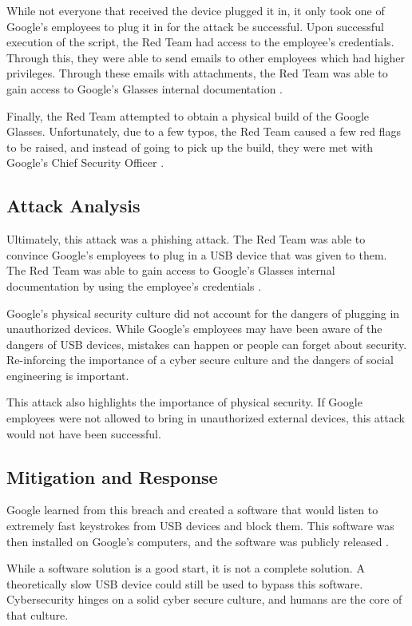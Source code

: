 \documentclass[acmsmall]{acmart}
\begin{document}
While not everyone that received the device plugged it in, it only took one of
Google's employees to plug it in for the attack be successful. Upon successful
execution of the script, the Red Team had access to the employee's credentials.
Through this, they were able to send emails to other employees which had higher
privileges. Through these emails with attachments, the Red Team was able to
gain access to Google's Glasses internal documentation \cite{GoogleGlobeVideo}.

Finally, the Red Team attempted to obtain a physical build of the Google Glasses.
Unfortunately, due to a few typos, the Red Team caused a few red flags to be raised,
and instead of going to pick up the build, they were met with Google's Chief Security
Officer \cite{GoogleGlobeVideo}.

\subsection{Attack Analysis}
Ultimately, this attack was a phishing attack. The Red Team was able to convince
Google's employees to plug in a USB device that was given to them. The Red Team
was able to gain access to Google's Glasses internal documentation by using the
employee's credentials \cite{GoogleGlobeVideo}.

Google's physical security culture did not account for the dangers of plugging in
unauthorized devices. While Google's employees may have been aware of the dangers
of USB devices, mistakes can happen or people can forget about security.
Re-inforcing the importance of a cyber secure culture and the dangers of social
engineering is important.

This attack also highlights the importance of physical security. If Google employees
were not allowed to bring in unauthorized external devices, this attack would not
have been successful.

\subsection{Mitigation and Response}
Google learned from this breach and created a software that would listen to extremely
fast keystrokes from USB devices and block them. This software was then installed
on Google's computers, and the software was publicly released \cite{GoogleUSB,GoogleRedTeamBlog}.

While a software solution is a good start, it is not a complete solution. A theoretically
slow USB device could still be used to bypass this software. Cybersecurity hinges
on a solid cyber secure culture, and humans are the core of that culture.
\end{document}
